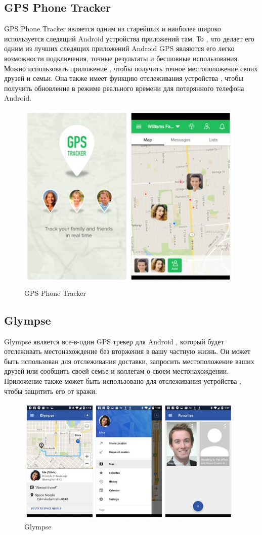 \documentclass[a4paper,12pt]{article}
\begin{document}
\subsection{GPS Phone Tracker}
GPS Phone Tracker является одним из старейших и наиболее широко используется следящий Android устройства приложений там. То , что делает его одним из лучших следящих приложений Android GPS являются его легко возможности подключения, точные результаты и бесшовные использования. Можно использовать приложение , чтобы получить точное местоположение своих друзей и семьи. Она также имеет функцию отслеживания устройства , чтобы получить обновление в режиме реального времени для потерянного телефона Android.\cite{review5}
\begin{figure}
	\centering
	\includegraphics[width=10.94cm]{images/15023616915620.jpg}
	\caption{GPS Phone Tracker}
	\label{fig:card}
\end{figure}
\subsection{Glympse}
Glympse является все-в-один GPS трекер для Android , который будет отслеживать местонахождение без вторжения в вашу частную жизнь. Он может быть использован для отслеживания доставки, запросить местоположение ваших друзей или сообщить своей семье и коллегам о своем местонахождении. Приложение также может быть использовано для отслеживания устройства , чтобы защитить его от кражи.\cite{review5}
\begin{figure}
	\centering
	\includegraphics[width=10.94cm]{images/15023616597135.jpg}
	\caption{Glympse}
	\label{fig:card}
\end{figure}
\end{document}
